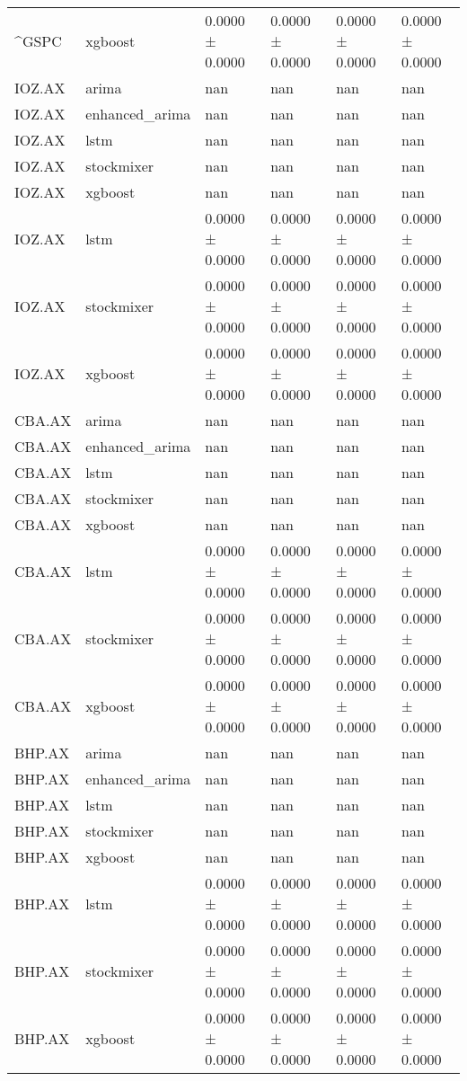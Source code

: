 \begin{table}[h!]
\begin{tabular}{llllll}
^GSPC & xgboost & 0.0000 ± 0.0000 & 0.0000 ± 0.0000 & 0.0000 ± 0.0000 & 0.0000 ± 0.0000 \\
IOZ.AX & arima & nan & nan & nan & nan \\
IOZ.AX & enhanced_arima & nan & nan & nan & nan \\
IOZ.AX & lstm & nan & nan & nan & nan \\
IOZ.AX & stockmixer & nan & nan & nan & nan \\
IOZ.AX & xgboost & nan & nan & nan & nan \\
IOZ.AX & lstm & 0.0000 ± 0.0000 & 0.0000 ± 0.0000 & 0.0000 ± 0.0000 & 0.0000 ± 0.0000 \\
IOZ.AX & stockmixer & 0.0000 ± 0.0000 & 0.0000 ± 0.0000 & 0.0000 ± 0.0000 & 0.0000 ± 0.0000 \\
IOZ.AX & xgboost & 0.0000 ± 0.0000 & 0.0000 ± 0.0000 & 0.0000 ± 0.0000 & 0.0000 ± 0.0000 \\
CBA.AX & arima & nan & nan & nan & nan \\
CBA.AX & enhanced_arima & nan & nan & nan & nan \\
CBA.AX & lstm & nan & nan & nan & nan \\
CBA.AX & stockmixer & nan & nan & nan & nan \\
CBA.AX & xgboost & nan & nan & nan & nan \\
CBA.AX & lstm & 0.0000 ± 0.0000 & 0.0000 ± 0.0000 & 0.0000 ± 0.0000 & 0.0000 ± 0.0000 \\
CBA.AX & stockmixer & 0.0000 ± 0.0000 & 0.0000 ± 0.0000 & 0.0000 ± 0.0000 & 0.0000 ± 0.0000 \\
CBA.AX & xgboost & 0.0000 ± 0.0000 & 0.0000 ± 0.0000 & 0.0000 ± 0.0000 & 0.0000 ± 0.0000 \\
BHP.AX & arima & nan & nan & nan & nan \\
BHP.AX & enhanced_arima & nan & nan & nan & nan \\
BHP.AX & lstm & nan & nan & nan & nan \\
BHP.AX & stockmixer & nan & nan & nan & nan \\
BHP.AX & xgboost & nan & nan & nan & nan \\
BHP.AX & lstm & 0.0000 ± 0.0000 & 0.0000 ± 0.0000 & 0.0000 ± 0.0000 & 0.0000 ± 0.0000 \\
BHP.AX & stockmixer & 0.0000 ± 0.0000 & 0.0000 ± 0.0000 & 0.0000 ± 0.0000 & 0.0000 ± 0.0000 \\
BHP.AX & xgboost & 0.0000 ± 0.0000 & 0.0000 ± 0.0000 & 0.0000 ± 0.0000 & 0.0000 ± 0.0000 \\
\bottomrule
\end{tabular}
\end{table}
